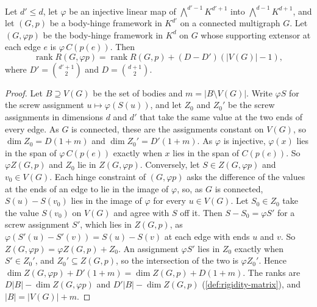 \begin{lemma}
  \label{lem:screw-embedding-rank}
  \leanok
  Let $d' \le d$, let $\varphi$ be an injective linear map of
  $\bigwedge^{d'-1} K^{d'+1}$ into $\bigwedge^{d-1} K^{d+1}$, and let
  $(G, p)$ be a body-hinge framework in $K^{d'}$ on a connected
  multigraph $G$. Let $(G, \varphi p)$ be the body-hinge framework in
  $K^d$ on $G$ whose supporting extensor at each edge $e$ is
  $\varphi\, C(p(e))$. Then
  \[
    \operatorname{rank} R(G, \varphi p)
      = \operatorname{rank} R(G, p) + (D - D')(|V(G)| - 1),
  \]
  where $D' = \binom{d'+1}{2}$ and $D = \binom{d+1}{2}$.
\end{lemma}
\begin{proof}
  \leanok
  Let $B \supseteq V(G)$ be the set of bodies and $m = |B \setminus V(G)|$.
  Write $\varphi S$ for the screw assignment $u \mapsto \varphi(S(u))$,
  and let $Z_0$ and $Z_0'$ be the screw assignments in dimensions $d$ and
  $d'$ that take the same value at the two ends of every edge. As $G$ is
  connected, these are the assignments constant on $V(G)$, so
  $\dim Z_0 = D(1 + m)$ and $\dim Z_0' = D'(1 + m)$. As $\varphi$ is
  injective, $\varphi(x)$ lies in the span of $\varphi\, C(p(e))$
  exactly when $x$ lies in the span of $C(p(e))$. So $\varphi Z(G, p)$
  and $Z_0$ lie in $Z(G, \varphi p)$. Conversely, let
  $S \in Z(G, \varphi p)$ and $v_0 \in V(G)$. Each hinge constraint of
  $(G, \varphi p)$ asks the difference of the values at the ends of an
  edge to lie in the image of $\varphi$, so, as $G$ is connected,
  $S(u) - S(v_0)$ lies in the image of $\varphi$ for every $u \in V(G)$.
  Let $S_0 \in Z_0$ take the value $S(v_0)$ on $V(G)$ and agree with $S$
  off it. Then $S - S_0 = \varphi S'$ for a screw assignment $S'$, which
  lies in $Z(G, p)$, as $\varphi(S'(u) - S'(v)) = S(u) - S(v)$ at each
  edge with ends $u$ and $v$. So $Z(G, \varphi p) = \varphi Z(G, p) + Z_0$.
  An assignment $\varphi S'$ lies in $Z_0$ exactly when $S' \in Z_0'$,
  and $Z_0' \subseteq Z(G, p)$, so the intersection of the two is
  $\varphi Z_0'$. Hence
  $\dim Z(G, \varphi p) + D'(1 + m) = \dim Z(G, p) + D(1 + m)$. The ranks
  are $D|B| - \dim Z(G, \varphi p)$ and $D'|B| - \dim Z(G, p)$
  (\cref{def:rigidity-matrix}), and $|B| = |V(G)| + m$.
\end{proof}

